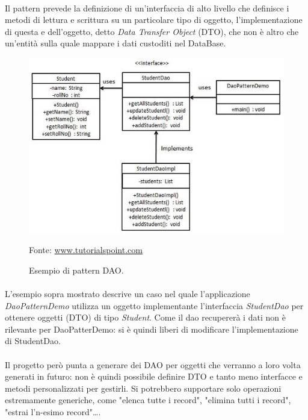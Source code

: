\documentclass[a4paper, 12pt]{report}
\newcommand{\source}[1]{\caption*{Fonte: {#1}}}
\begin{document}
      \paragraph*{}
      Il pattern prevede la definizione di un'interfaccia di alto livello che definisce i metodi di lettura e scrittura su un particolare tipo di oggetto, l'implementazione di questa e dell'oggetto, detto \emph{Data Transfer Object} (DTO), che non è altro che un'entità sulla quale mappare i dati custoditi nel DataBase.
      \begin{figure}[H]
        \includegraphics[width=\textwidth]{dao_pattern_uml_diagram.jpg}
        \caption{Esempio di pattern DAO.}
        \source{\href{https://www.tutorialspoint.com/design_pattern/images/dao_pattern_uml_diagram.jpg}{www.tutorialspoint.com}}
      \end{figure}
      \paragraph*{}
      L'esempio sopra mostrato descrive un caso nel quale l'applicazione \emph{DaoPatternDemo} utilizza un oggetto implementante l'interfaccia \emph{StudentDao} per ottenere oggetti (DTO) di tipo \emph{Student}.
      Come il dao recupererà i dati non è rilevante per DaoPatterDemo: si è quindi liberi di modificare l'implementazione di StudentDao.
      \paragraph*{}
      Il progetto però punta a generare dei DAO per oggetti che verranno a loro volta generati in futuro: non è quindi possibile definire DTO e tanto meno interfacce e metodi personalizzati per gestirli.
      Si potrebbero supportare solo operazioni estremamente generiche, come "elenca tutte i record", "elimina tutti i record", "estrai l'n-esimo record"\dots.
\end{document}
